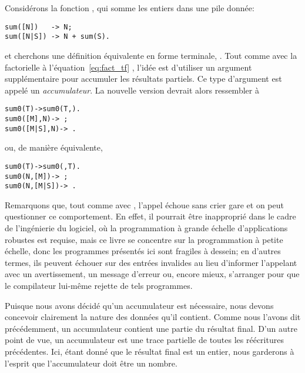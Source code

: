 Considérons la fonction , qui somme les entiers dans
une pile donnée:
\begin{verbatim}
sum([N])   -> N;
sum([N|S]) -> N + sum(S).
\end{verbatim}
et cherchons une définition équivalente en forme terminale,
. Tout comme avec la factorielle à
l'équation~\eqref{eq:fact_tf} , l'idée est
d'utiliser un argument supplémentaire pour accumuler les résultats
partiels. Ce type d'argument est appelé un \emph{accumulateur}. La
nouvelle version devrait alors ressembler à
\begin{alltt}
sum0(T)       -> sum0(T,).
sum0([M],N)   -> \,;
sum0([M|S],N) -> \,.
\end{alltt}
ou, de manière équivalente,
\begin{alltt}
sum0(T)       -> sum0(,T).
sum0(N,[M])   -> \,;
sum0(N,[M|S]) -> \,.
\end{alltt}
Remarquons que, tout comme avec , l'appel
 échoue sans crier gare et on peut questionner ce
comportement. En effet, il pourrait être inapproprié dans le cadre de
l'ingénierie du logiciel, où la programmation à grande échelle
d'applications robustes est requise, mais ce livre se concentre sur la
programmation à petite échelle, donc les programmes présentés ici sont
fragiles à dessein; en d'autres termes, ils peuvent échouer sur des
entrées invalides au lieu d'informer l'appelant avec un avertissement,
un message d'erreur ou, encore mieux, s'arranger pour que le
compilateur lui-même rejette de tels programmes.

Puisque nous avons décidé qu'un accumulateur est nécessaire, nous
devons concevoir clairement la nature des données qu'il
contient. Comme nous l'avons dit précédemment, un accumulateur
contient une partie du résultat final. D'un autre point de vue, un
accumulateur est une trace partielle de toutes les réécritures
précédentes. Ici, étant donné que le résultat final est un entier,
nous garderons à l'esprit que l'accumulateur doit être un nombre.

